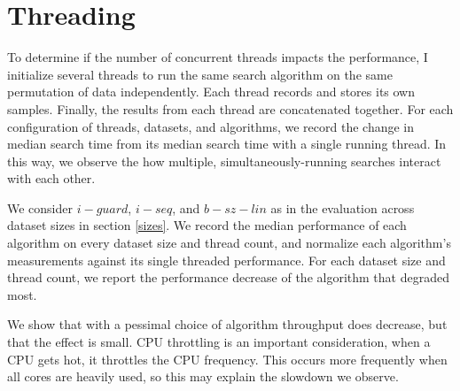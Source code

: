 \documentclass[twocolumn]{article}
\begin{document}
\begin{figure}[t]
\end{figure} \label{compare}

\section{Threading}
To determine if the number of concurrent threads impacts the performance, I initialize several threads to run the same search algorithm on the same permutation of data independently. Each thread records and stores its own samples. Finally, the results from each thread are concatenated together. For each configuration of threads, datasets, and algorithms, we record the change in median search time from its median search time with a single running thread. In this way, we observe the how multiple, simultaneously-running searches interact with each other.

We consider $i-guard$, $i-seq$, and $b-sz-lin$ as in the evaluation across dataset sizes in section \ref{sizes}. We record the median performance of each algorithm on every dataset size and thread count, and normalize each algorithm's measurements against its single threaded performance. For each dataset size and thread count, we report the performance decrease of the algorithm that degraded most. 

We show that with a pessimal choice of algorithm throughput does decrease, but that the effect is small. CPU throttling is an important consideration, when a CPU gets hot, it throttles the CPU frequency. This occurs more frequently when all cores are heavily used, so this may explain the slowdown we observe.
\end{document}
